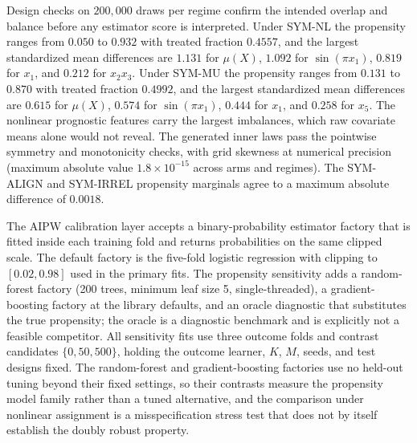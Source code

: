 Design checks on $200{,}000$ draws per regime confirm the intended overlap and balance before any estimator score is interpreted. Under SYM-NL the propensity ranges from $0.050$ to $0.932$ with treated fraction $0.4557$, and the largest standardized mean differences are $1.131$ for $\mu(X)$, $1.092$ for $\sin(\pi x_1)$, $0.819$ for $x_1$, and $0.212$ for $x_2x_3$. Under SYM-MU the propensity ranges from $0.131$ to $0.870$ with treated fraction $0.4992$, and the largest standardized mean differences are $0.615$ for $\mu(X)$, $0.574$ for $\sin(\pi x_1)$, $0.444$ for $x_1$, and $0.258$ for $x_5$. The nonlinear prognostic features carry the largest imbalances, which raw covariate means alone would not reveal. The generated inner laws pass the pointwise symmetry and monotonicity checks, with grid skewness at numerical precision (maximum absolute value $1.8\times10^{-15}$ across arms and regimes). The SYM-ALIGN and SYM-IRREL propensity marginals agree to a maximum absolute difference of $0.0018$.

The AIPW calibration layer accepts a binary-probability estimator factory that is fitted inside each training fold and returns probabilities on the same clipped scale. The default factory is the five-fold logistic regression with clipping to $[0.02,0.98]$ used in the primary fits. The propensity sensitivity adds a random-forest factory (200 trees, minimum leaf size 5, single-threaded), a gradient-boosting factory at the library defaults, and an oracle diagnostic that substitutes the true propensity; the oracle is a diagnostic benchmark and is explicitly not a feasible competitor. All sensitivity fits use three outcome folds and contrast candidates $\{0,50,500\}$, holding the outcome learner, $K$, $M$, seeds, and test designs fixed. The random-forest and gradient-boosting factories use no held-out tuning beyond their fixed settings, so their contrasts measure the propensity model family rather than a tuned alternative, and the comparison under nonlinear assignment is a misspecification stress test that does not by itself establish the doubly robust property.
